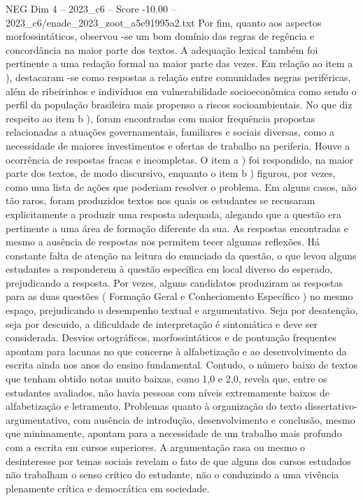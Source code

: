 \begin{textsample}{NEG Dim 4 – 2023\_c6 – Score -10.00 – 2023\_c6/enade\_2023\_zoot\_a5e91995a2.txt}
Por fim, quanto aos aspectos morfossintáticos, observou -se um bom domínio das regras de regência e concordância na maior parte dos textos.
A adequação lexical também foi pertinente a uma redação formal na maior parte das vezes.
Em relação ao item a ), destacaram -se como respostas a relação entre comunidades negras periféricas, além de ribeirinhos e indivíduos em vulnerabilidade socioeconômica como sendo o perfil da população brasileira mais propenso a riscos socioambientais.
No que diz respeito ao item b ), foram encontradas com maior frequência propostas relacionadas a atuações governamentais, familiares e sociais diversas, como a necessidade de maiores investimentos e ofertas de trabalho na periferia.
Houve a ocorrência de respostas fracas e incompletas.
O item a ) foi respondido, na maior parte dos textos, de modo discursivo, enquanto o item b ) figurou, por vezes, como uma lista de ações que poderiam resolver o problema.
Em alguns casos, não tão raros, foram produzidos textos nos quais os estudantes se recusaram explicitamente a produzir uma resposta adequada, alegando que a questão era pertinente a uma área de formação diferente da sua.
As respostas encontradas e mesmo a ausência de respostas nos permitem tecer algumas reflexões.
Há constante falta de atenção na leitura do enunciado da questão, o que levou alguns estudantes a responderem à questão específica em local diverso do esperado, prejudicando a resposta.
Por vezes, alguns candidatos produziram as respostas para as duas questões ( Formação Geral e Conheciomento Específico ) no mesmo espaço, prejudicando o desempenho textual e argumentativo.
Seja por desatenção, seja por descuido, a dificuldade de interpretação é sintomática e deve ser considerada.
Desvios ortográficos, morfossintáticos e de pontuação frequentes apontam para lacunas no que concerne à alfabetização e ao desenvolvimento da escrita ainda nos anos do ensino fundamental.
Contudo, o número baixo de textos que tenham obtido notas muito baixas, como 1,0 e 2,0, revela que, entre os estudantes avaliados, não havia pessoas com níveis extremamente baixos de alfabetização e letramento.
Problemas quanto à organização do texto dissertativo-argumentativo, com ausência de introdução, desenvolvimento e conclusão, mesmo que minimamente, apontam para a necessidade de um trabalho mais profundo com a escrita em cursos superiores.
A argumentação rasa ou mesmo o desinteresse por temas sociais revelam o fato de que alguns dos cursos estudados não trabalham o senso crítico do estudante, não o conduzindo a uma vivência plenamente crítica e democrática em sociedade.

\end{textsample}
